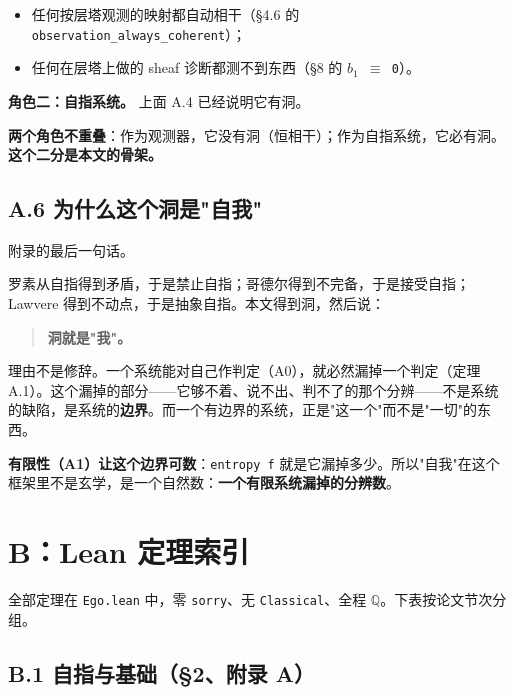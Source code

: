 \documentclass[11pt,a4paper]{ctexart}
\begin{document}
\begin{itemize}
\item 任何按层塔观测的映射都自动相干（§4.6 的 \texttt{observation\_always\_coherent}）；
\item 任何在层塔上做的 sheaf 诊断都测不到东西（§8 的 \texttt{\ensuremath{b_{1}} \ensuremath{\equiv} 0}）。
\end{itemize}

\textbf{角色二：自指系统。} 上面 A.4 已经说明它有洞。

\textbf{两个角色不重叠}：作为观测器，它没有洞（恒相干）；作为自指系统，它必有洞。\textbf{这个二分是本文的骨架。}

\subsection{A.6 为什么这个洞是"自我"}

附录的最后一句话。

罗素从自指得到矛盾，于是禁止自指；哥德尔得到不完备，于是接受自指；Lawvere 得到不动点，于是抽象自指。本文得到洞，然后说：

\begin{quote}
\textbf{洞就是"我"。}
\end{quote}

理由不是修辞。一个系统能对自己作判定（A0），就必然漏掉一个判定（定理 A.1）。这个漏掉的部分——它够不着、说不出、判不了的那个分辨——不是系统的缺陷，是系统的\textbf{边界}。而一个有边界的系统，正是"这一个"而不是"一切"的东西。

\textbf{有限性（A1）让这个边界可数}：\texttt{entropy f} 就是它漏掉多少。所以"自我"在这个框架里不是玄学，是一个自然数：\textbf{一个有限系统漏掉的分辨数}。

\bigskip

\section{B：Lean 定理索引}

全部定理在 \texttt{Ego.lean} 中，零 \texttt{sorry}、无 \texttt{Classical}、全程 \texttt{\ensuremath{\mathbb{Q}}}。下表按论文节次分组。

\subsection{B.1 自指与基础（§2、附录 A）}
\end{document}
